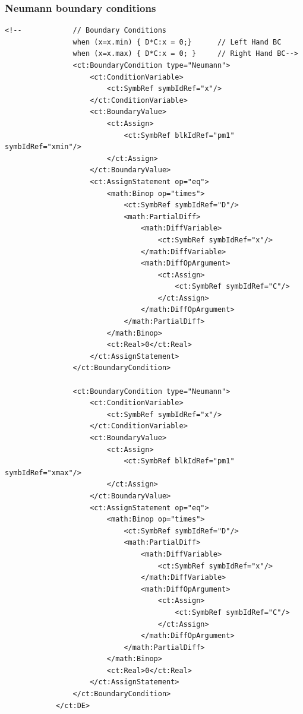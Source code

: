 \subsubsection*{Neumann boundary conditions}

\lstset{language=XML}
\begin{lstlisting}
<!--            // Boundary Conditions
                when (x=x.min) { D*C:x = 0;}      // Left Hand BC
                when (x=x.max) { D*C:x = 0; }     // Right Hand BC-->
                <ct:BoundaryCondition type="Neumann">
                    <ct:ConditionVariable>
                        <ct:SymbRef symbIdRef="x"/>
                    </ct:ConditionVariable>
                    <ct:BoundaryValue>
                        <ct:Assign>
                            <ct:SymbRef blkIdRef="pm1" symbIdRef="xmin"/>
                        </ct:Assign>
                    </ct:BoundaryValue>
                    <ct:AssignStatement op="eq">
                        <math:Binop op="times">
                            <ct:SymbRef symbIdRef="D"/>
                            <math:PartialDiff>
                                <math:DiffVariable>
                                    <ct:SymbRef symbIdRef="x"/>
                                </math:DiffVariable>
                                <math:DiffOpArgument>
                                    <ct:Assign>
                                        <ct:SymbRef symbIdRef="C"/>
                                    </ct:Assign>
                                </math:DiffOpArgument>
                            </math:PartialDiff>
                        </math:Binop>
                        <ct:Real>0</ct:Real>
                    </ct:AssignStatement>
                </ct:BoundaryCondition>

                <ct:BoundaryCondition type="Neumann">
                    <ct:ConditionVariable>
                        <ct:SymbRef symbIdRef="x"/>
                    </ct:ConditionVariable>
                    <ct:BoundaryValue>
                        <ct:Assign>
                            <ct:SymbRef blkIdRef="pm1" symbIdRef="xmax"/>
                        </ct:Assign>
                    </ct:BoundaryValue>
                    <ct:AssignStatement op="eq">
                        <math:Binop op="times">
                            <ct:SymbRef symbIdRef="D"/>
                            <math:PartialDiff>
                                <math:DiffVariable>
                                    <ct:SymbRef symbIdRef="x"/>
                                </math:DiffVariable>
                                <math:DiffOpArgument>
                                    <ct:Assign>
                                        <ct:SymbRef symbIdRef="C"/>
                                    </ct:Assign>
                                </math:DiffOpArgument>
                            </math:PartialDiff>
                        </math:Binop>
                        <ct:Real>0</ct:Real>
                    </ct:AssignStatement>
                </ct:BoundaryCondition>
            </ct:DE>
\end{lstlisting}


